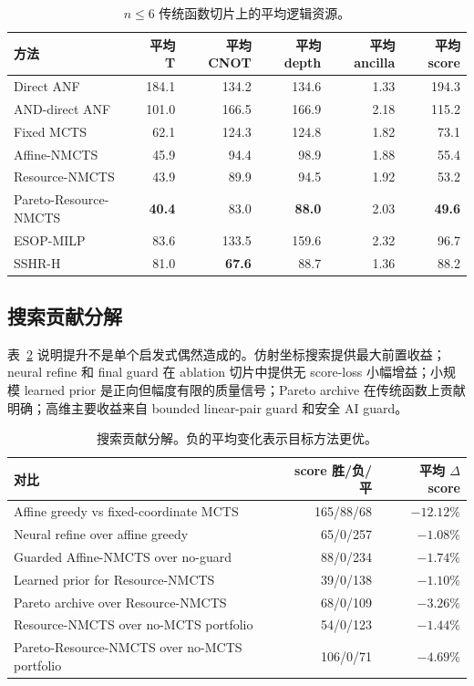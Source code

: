 \documentclass[UTF8,fontset=macnew,11pt]{ctexart}
\newcommand{\method}{Resource-NMCTS}
\newcommand{\pareto}{Pareto-Resource-NMCTS}
\begin{document}
\begin{table}[t]
\centering
\small
\caption{$n\leq 6$ 传统函数切片上的平均逻辑资源。}
\label{tab:traditional}
\begin{tabular}{lrrrrr}
\toprule
方法 & 平均 T & 平均 CNOT & 平均 depth & 平均 ancilla & 平均 score \\
\midrule
Direct ANF & 184.1 & 134.2 & 134.6 & 1.33 & 194.3 \\
AND-direct ANF & 101.0 & 166.5 & 166.9 & 2.18 & 115.2 \\
Fixed MCTS & 62.1 & 124.3 & 124.8 & 1.82 & 73.1 \\
Affine-NMCTS & 45.9 & 94.4 & 98.9 & 1.88 & 55.4 \\
\method{} & 43.9 & 89.9 & 94.5 & 1.92 & 53.2 \\
\pareto{} & \textbf{40.4} & 83.0 & \textbf{88.0} & 2.03 & \textbf{49.6} \\
ESOP-MILP & 83.6 & 133.5 & 159.6 & 2.32 & 96.7 \\
SSHR-H & 81.0 & \textbf{67.6} & 88.7 & 1.36 & 88.2 \\
\bottomrule
\end{tabular}
\end{table}

\subsection{搜索贡献分解}

表~\ref{tab:contribution} 说明提升不是单个启发式偶然造成的。仿射坐标搜索提供最大前置收益；neural refine 和 final guard 在 ablation 切片中提供无 score-loss 小幅增益；小规模 learned prior 是正向但幅度有限的质量信号；Pareto archive 在传统函数上贡献明确；高维主要收益来自 bounded linear-pair guard 和安全 AI guard。

\begin{table}[t]
\centering
\small
\caption{搜索贡献分解。负的平均变化表示目标方法更优。}
\label{tab:contribution}
\begin{tabularx}{\linewidth}{>{\raggedright\arraybackslash}Xrr}
\toprule
对比 & score 胜/负/平 & 平均 $\Delta$ score \\
\midrule
Affine greedy vs fixed-coordinate MCTS & 165/88/68 & $-12.12\%$ \\
Neural refine over affine greedy & 65/0/257 & $-1.08\%$ \\
Guarded Affine-NMCTS over no-guard & 88/0/234 & $-1.74\%$ \\
Learned prior for \method{} & 39/0/138 & $-1.10\%$ \\
Pareto archive over \method{} & 68/0/109 & $-3.26\%$ \\
\method{} over no-MCTS portfolio & 54/0/123 & $-1.44\%$ \\
\pareto{} over no-MCTS portfolio & 106/0/71 & $-4.69\%$ \\
\bottomrule
\end{tabularx}
\end{table}
\end{document}
